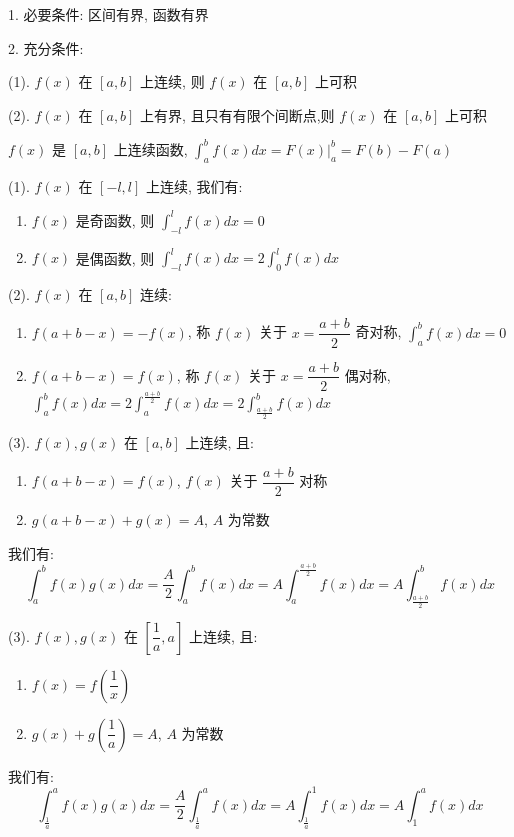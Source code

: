 \begin{theorem}[定积分存在定理]
	1. 必要条件: 区间有界, 函数有界

	2. 充分条件:

	(1). $f(x)$ 在 $[a,b]$ 上连续, 则 $f(x)$ 在 $[a,b]$ 上可积

	(2). $f(x)$ 在 $[a,b]$ 上有界, 且只有有限个间断点,则 $f(x)$ 在 $[a,b]$ 上可积
\end{theorem}
\begin{theorem}[牛顿莱布尼茨公式]
	$f(x)$ 是 $[a,b]$ 上连续函数, $\int_{a}^{b}f(x)dx = F(x)|_{a}^{b} = F(b) - F(a)$
\end{theorem}
\begin{theorem}[对称函数积分]
	(1). $f(x)$ 在 $[-l,l]$ 上连续, 我们有:
	\begin{enumerate}
		\item $f(x)$ 是奇函数, 则 $\int_{-l}^{l} f(x)dx = 0$
		\item $f(x)$ 是偶函数, 则 $\int_{-l}^{l} f(x)dx = 2\int_{0}^{l} f(x)dx$
	\end{enumerate}

	(2). $f(x)$ 在 $[a,b]$ 连续:
	\begin{enumerate}
		\item $f(a+b-x) = -f(x)$, 称 $f(x)$ 关于 $x = \dfrac{a+b}{2}$ 奇对称, $\int_{a}^{b}f(x)dx = 0$
		\item $f(a+b-x) = f(x)$, 称 $f(x)$ 关于 $x = \dfrac{a+b}{2}$ 偶对称, $\int_{a}^{b}f(x)dx = 2\int_{a}^{\frac{a+b}{2}}f(x)dx = 2\int_{\frac{a+b}{2}}^{b}f(x)dx$
	\end{enumerate}

	(3). $f(x),g(x)$ 在 $[a,b]$ 上连续, 且:

	\begin{enumerate}
		\item $f(a+b-x) = f(x)$, $f(x)$ 关于 $\dfrac{a+b}{2}$ 对称
		\item $g(a+b-x) + g(x) =A$, $A$ 为常数
	\end{enumerate}

	我们有:
	$$\int_{a}^{b}f(x)g(x) dx= \dfrac{A}{2}\int_{a}^{b}f(x)dx = A\int_{a}^{\frac{a+b}{2}}f(x)dx = A\int_{\frac{a+b}{2}}^{b}f(x)dx$$

	(3). $f(x),g(x)$ 在 $[\dfrac{1}{a},a]$ 上连续, 且:

	\begin{enumerate}
		\item $f(x) = f(\dfrac{1}{x})$
		\item $g(x) + g(\dfrac{1}{a}) =A$, $A$ 为常数
	\end{enumerate}

	我们有:
	$$\int_{\frac{1}{a}}^{a}f(x)g(x) dx= \dfrac{A}{2}\int_{\frac{1}{a}}^{a}f(x)dx = A\int_{\frac{1}{a}}^{1}f(x)dx = A\int_{1}^{a}f(x)dx$$
\end{theorem}
